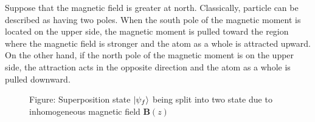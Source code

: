 \documentclass[../../../main.tex]{subfiles}
\begin{document}
Suppose that the magnetic field is greater at north.
Classically, particle can be described as having two poles.
When the south pole of the magnetic moment is located on the upper side, the magnetic moment is pulled toward the region where the magnetic field is stronger and the atom as a whole is attracted upward.
On the other hand, if the north pole of the magnetic moment is on the upper side, the attraction acts in the opposite direction and the atom as a whole is pulled downward.

\begin{figure}
  \centering
  \caption*{Figure: Superposition state $\ket{\psi_f}$ being split into two state due to inhomogeneous magnetic field $\mathbf{B}(z)$}
\end{figure}
\end{document}
